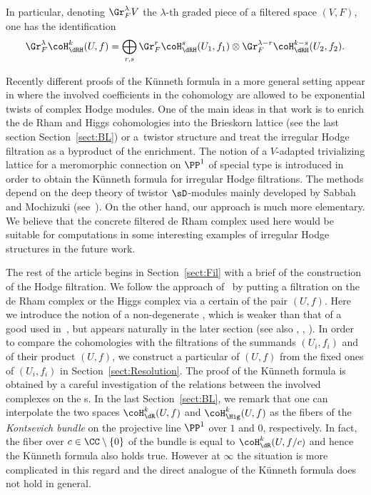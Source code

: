 In particular, denoting $\Gr_F^\lambda V$ the $\lambda$-th graded piece of a filtered space $(V,F)$, one has the identification
\begin{gather*} \Gr_F^\lambda\coH_\dRH^k(U,f) = \bigoplus_{r,s} \Gr_F^r\coH_\dRH^s(U_1,f_1) \otimes \Gr_F^{\lambda-r}\coH_\dRH^{k-s}(U_2,f_2). \end{gather*}

Recently different proofs of the K\"unneth formula in a more general setting appear in \cite[Theorem~3.39]{S2} where the involved coefficients in the cohomology are allowed to be exponential twists of complex Hodge modules. One of the main ideas in that work is to enrich the de Rham and Higgs cohomologies into the Brieskorn lattice (see the last section Section~\ref{sect:BL}) or a~twistor structure and treat the irregular Hodge filtration as a byproduct of the enrichment. The notion of a $V$-adapted trivializing lattice for a meromorphic connection on $\PP^1$ of special type is introduced \cite[Section~3.2.b]{S2} in order to obtain the K\"unneth formula for irregular Hodge filtrations. The methods depend on the deep theory of twistor $\sD$-modules mainly developed by Sabbah and Mochizuki (see~\cite{M_twistor}). On the other hand, our approach is much more elementary. We believe that the concrete filtered de Rham complex used here would be suitable for computations in some interesting examples of irregular Hodge structures in the future work.

The rest of the article begins in Section~\ref{sect:Fil} with a brief of the construction of the Hodge filtration. We follow the approach of~\cite{Y} by putting a filtration on the de Rham complex or the Higgs complex via a certain {\cpt} of the pair $(U,f)$. Here we introduce the notion of a non-degenerate {\cpt}, which is weaker than that of a good {\cpt} used in~\cite{Y}, but appears naturally in the later section (see also \cite[Section~4]{S}, \cite[Section~7.3]{SY}, \cite{M_GKZ}). In order to compare the cohomologies with the filtrations of the summands $(U_i,f_i)$ and of their product $(U,f)$, we construct a particular {\cpt} of $(U,f)$
from the fixed ones of $(U_i,f_i)$ in Section~\ref{sect:Resolution}. The proof of the K\"unneth formula is obtained by a careful investigation of the relations between the involved complexes on the {\cpt}s. In the last Section~\ref{sect:BL}, we remark that one can interpolate the two spaces $\coH_\dR^k(U,f)$ and $\coH_\Hig^k(U,f)$ as the fibers of the \textit{Kontsevich bundle} on the projective line $\PP^1$ over $1$ and $0$, respectively.
In fact, the fiber over $c\in \CC\setminus \{0\}$ of the bundle is equal to $\coH_\dR^k(U,f/c)$ and hence the K\"unneth formula also holds true. However at $\infty$ the situation is more complicated in this regard and the direct analogue of the K\"unneth formula does not hold in general.

